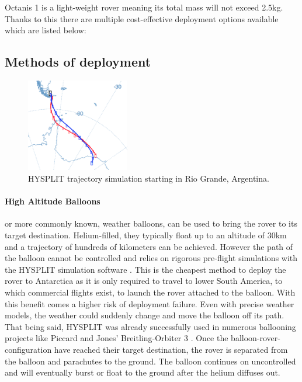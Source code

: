 \documentclass[a4paper,12pt]{article}
\begin{document}
Octanis 1 is a light-weight rover meaning its total mass will not exceed 2.5kg. Thanks to this there are multiple cost-effective deployment options available which are listed below:

\subsection{Methods of deployment}

\begin{figure}[h!]
	\centering
    \includegraphics[width=0.4\textwidth]{trajectory}
    \caption{HYSPLIT trajectory simulation starting in Rio Grande, Argentina.}
\end{figure}

\paragraph{High Altitude Balloons} or more commonly known, weather balloons, can be used to bring the rover to its target destination. Helium-filled, they typically float up to an altitude of 30km and a trajectory of hundreds of kilometers can be achieved. However the path of the balloon cannot be controlled and relies on rigorous pre-flight simulations with the HYSPLIT simulation software \cite{hysplit} \cite{hysplitjava}. This is the cheapest method to deploy the rover to Antarctica as it is only required to travel to lower South America, to which commercial flights exist, to launch the rover attached to the balloon. With this benefit comes a higher risk of deployment failure. Even with precise weather models, the weather could suddenly change and move the balloon off its path. That being said, HYSPLIT was already successfully used in numerous ballooning projects like Piccard and Jones' Breitling-Orbiter 3 \cite{hysplitexamples}.
Once the balloon-rover-configuration have reached their target destination, the rover is separated from the balloon and parachutes to the ground. The balloon continues on uncontrolled and will eventually burst or float to the ground after the helium diffuses out.
\end{document}
